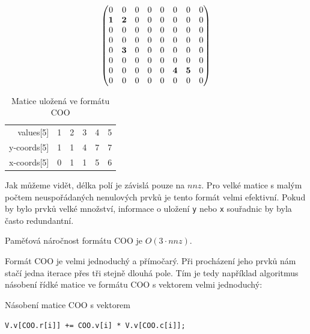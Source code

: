 \begin{align}
\begin{pmatrix}
	0 & 0 & 0 & 0 & 0 & 0 & 0 & 0 \\
	\boldsymbol{1} & \boldsymbol{2} & 0 & 0 & 0 & 0 & 0 & 0 \\
	0 & 0 & 0 & 0 & 0 & 0 & 0 & 0 \\
	0 & 0 & 0 & 0 & 0 & 0 & 0 & 0 \\
	0 & \boldsymbol{3} & 0 & 0 & 0 & 0 & 0 & 0 \\
	0 & 0 & 0 & 0 & 0 & 0 & 0 & 0 \\
	0 & 0 & 0 & 0 & 0 & \boldsymbol{4} & \boldsymbol{5} & 0 \\
	0 & 0 & 0 & 0 & 0 & 0 & 0 & 0 \\	
\end{pmatrix} \notag
\end{align}

\begin{table}[htb]
    \begin{tabular}{r|lllll}
    values[5]   & 1 & 2 & 3 & 4 & 5 \\
    y-coords[5] & 1 & 1 & 4 & 7 & 7 \\
    x-coords[5] & 0 & 1 & 1 & 5 & 6 \\
    \end{tabular}
    \caption{Matice uložená ve formátu COO}
\end{table}

Jak můžeme vidět, délka polí je závislá pouze na $nnz$. Pro velké matice s malým počtem neuspořádaných nenulových prvků je tento formát velmi efektivní. Pokud by bylo prvků velké množství, informace o uložení \texttt{y} nebo \texttt{x} souřadnic by byla často redundantní.

Paměťová náročnost formátu COO je $O(3 \cdot nnz)$.

Formát COO je velmi jednoduchý a přímočarý. Při procházení jeho prvků nám stačí jedna iterace přes tři stejně dlouhá pole. Tím je tedy například algoritmus násobení řídké matice ve formátu COO s vektorem velmi jednoduchý:

\begin{algorithm}[htb]
	\caption{Násobení matice COO s vektorem}\label{coo-mvm}
	\begin{algorithmic}[1]
			\State \texttt{V.v[COO.r[i]] += COO.v[i] * V.v[COO.c[i]];	}
		\EndFor
		\EndProcedure
	\end{algorithmic}
\end{algorithm}

